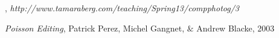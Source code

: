 \documentclass[11pt]{article}
\begin{document}
\newpage





\begin{thebibliography}{}

, {\it http://www.tamaraberg.com/teaching/Spring13/compphotog/3}

 {\it Poisson Editing}, Patrick Perez, Michel Gangnet, $\&$ Andrew Blacke, 2003

\end{thebibliography}
\end{document}
